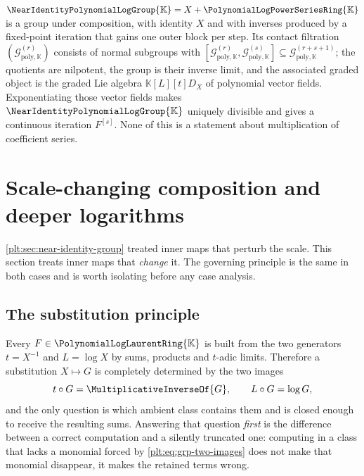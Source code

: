 \documentclass[11pt,oneside]{article}
\theoremstyle{plain}
\theoremstyle{definition}
\theoremstyle{remark}
\newcommand{\K}{\mathbb{K}}
\newcommand{\PLpow}{\PolynomialLogPowerSeriesRing{\K}}   %
\newcommand{\PLlau}{\PolynomialLogLaurentRing{\K}}       %
\newcommand{\Gnear}{\NearIdentityPolynomialLogGroup{\K}} %
\newcommand{\Gfilt}[1]{\mathcal{G}^{(#1)}_{\mathrm{poly},\K}}
\newcommand{\DX}{D_{X}}                                  %
\newcommand{\compose}{\mathbin{\circ}}
\begin{document}
\begin{summarybox}
\(\Gnear=X+\PLpow\) is a group under composition, with identity \(X\) and with
inverses produced by a fixed-point iteration that gains one outer block per
step.  Its contact filtration \((\Gfilt{r})\) consists of normal subgroups with
\([\Gfilt{r},\Gfilt{s}]\subseteq\Gfilt{r+s+1}\); the quotients are nilpotent,
the group is their inverse limit, and the associated graded object is the
graded Lie algebra \(\K[L][t]\DX\) of polynomial vector fields.  Exponentiating
those vector fields makes \(\Gnear\) uniquely divisible and gives a continuous
iteration \(F^{[s]}\).  None of this is a statement about multiplication of
coefficient series.
\end{summarybox}


\section{Scale-changing composition and deeper logarithms}
\label{plt:sec:scale-change}

\cref{plt:sec:near-identity-group} treated inner maps that perturb the scale.
This section treats inner maps that \emph{change} it.  The governing principle
is the same in both cases and is worth isolating before any case analysis.

\subsection{The substitution principle}

Every \(F\in\PLlau\) is built from the two generators \(t=X^{-1}\) and
\(L=\log X\) by sums, products and \(t\)-adic limits.  Therefore a substitution
\(X\mapsto G\) is completely determined by the two images
\begin{equation}\label{plt:eq:grp-two-images}
  t\compose G=\MultiplicativeInverseOf{G},
  \qquad
  L\compose G=\log G,
\end{equation}
and the only question is which ambient class contains them and is closed enough
to receive the resulting sums.  Answering that question \emph{first} is the
difference between a correct computation and a silently truncated one:
computing in a class that lacks a monomial forced by
\eqref{plt:eq:grp-two-images} does not make that monomial disappear, it makes
the retained terms wrong.
\end{document}
